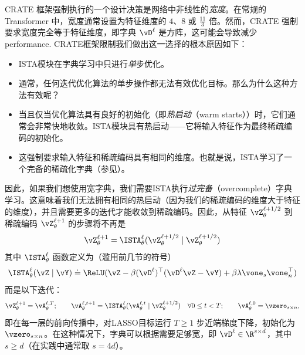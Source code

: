 \documentclass[../../book-main_zh.tex]{subfiles}
\begin{document}
CRATE 框架强制执行的一个设计决策是网络中非线性的\textit{宽度}。在常规的 Transformer 中，宽度通常设置为特征维度的 \(4\)、\(8\) 或 \(\frac{11}{3}\) 倍。然而，CRATE 强制要求宽度完全等于特征维度，即字典 \(\vD^{\ell}\) 是方阵，这可能会导致减少
performance. CRATE框架限制我们做出这一选择的根本原因如下：
\begin{itemize}
\item ISTA模块在字典学习中只进行\textit{单}步优化。
\item 通常，任何迭代优化算法的单步操作都无法有效优化目标。那么为什么这种方法有效呢？
\item 当且仅当优化算法具有良好的初始化（即\textit{热启动}（warm starts））时，它们通常会非常快地收敛。ISTA模块具有热启动——它将输入特征作为最终稀疏编码的初始化。
\item 这强制要求输入特征和稀疏编码具有相同的维度。也就是说，ISTA学习了一个完备的稀疏化字典（参见）。
\end{itemize}
因此，如果我们想使用宽字典，我们需要ISTA执行\textit{过完备}（overcomplete）字典学习。这意味着我们无法拥有相同的热启动（因为我们的稀疏编码的维度大于特征的维度），并且需要更多的迭代才能收敛到稀疏编码。因此，从特征 \(\vZ_{\theta}^{\ell + 1/2}\) 到稀疏编码 \(\vZ_{\theta}^{\ell + 1}\) 的步骤将不再是
\begin{equation}
\vZ_{\theta}^{\ell + 1} = \ISTA_{\theta}^{\ell}(\vZ_{\theta}^{\ell +
1/2} \mid \vZ_{\theta}^{\ell + 1/2})
\end{equation}
其中 \(\ISTA_{\theta}^{\ell}\) 函数定义为（滥用前几节的符号）
\begin{equation}
\ISTA_{\theta}^{\ell}(\vZ \mid \vY) \doteq \ReLU(\vZ - \beta
(\vD^{\ell})^{\top}(\vD^{\ell}\vZ - \vY) + \beta \lambda
\vone_{s}\vone_{n}^{\top})
\end{equation}
而是以下迭代：
\begin{equation}
\vZ_{\theta}^{\ell + 1} = \vA_{\theta}^{\ell, T}; \qquad
\vA_{\theta}^{\ell, t + 1} =
\ISTA_{\theta}^{\ell}(\vA_{\theta}^{\ell, t} \mid \vZ_{\theta}^{\ell
+ 1/2}) \quad \forall 0 \leq t < T; \qquad \vA_{\theta}^{\ell, 0} =
\vzero_{s \times n},
\end{equation}
即在每一层的前向传播中，对LASSO目标运行 \(T \geq
1\) 步近端梯度下降，初始化为
\(\vzero_{s \times n}\)。在这种情况下，字典可以根据需要足够宽，即 \(\vD^{\ell} \in \R^{s \times d}\)，其中 \(s
\geq d\)（在实践中通常取 \(s = 4d\)）。
\end{document}
